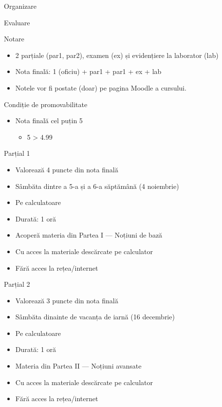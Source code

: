 \documentclass[xcolor=pdftex,romanian,colorlinks]{beamer}
\begin{document}
\begin{section}{Organizare}
\begin{frame}{Evaluare}
\begin{block}{Notare}
\begin{itemize}
\item 2 parțiale (par1, par2), examen (ex) și evidențiere la laborator (lab)
\item Nota finală: 1 (oficiu) + par1 + par1 + ex + lab
\item Notele vor fi postate (doar) pe pagina Moodle a cursului.
\end{itemize}
\end{block}

\begin{block}{Condiție de promovabilitate}
\begin{itemize}
\item Nota finală \alert{cel puțin 5}
\begin{itemize}
  \item 5 > 4.99
\end{itemize}
\end{itemize}
\end{block}

\end{frame}

\begin{frame}{Parțial 1}
\begin{itemize}
\item Valorează 4 puncte din nota finală
\item Sâmbăta dintre a 5-a și a 6-a săptămână (4 noiembrie)
\item Pe calculatoare
\item Durată: 1 oră
\item Acoperă materia din Partea I --- Noțiuni de bază
\item Cu acces la materiale descărcate pe calculator
\item Fără acces la rețea/internet
\end{itemize}
\end{frame}

\begin{frame}{Parțial 2}
\begin{itemize}
\item Valorează 3 puncte din nota finală
\item Sâmbăta dinainte de vacanța de iarnă  (16 decembrie)
\item Pe calculatoare
\item Durată: 1 oră
\item Materia din Partea II --- Noțiuni avansate
\item Cu acces la materiale descărcate pe calculator
\item Fără acces la rețea/internet
\end{itemize}
\end{frame}


\end{section}
\end{document}

